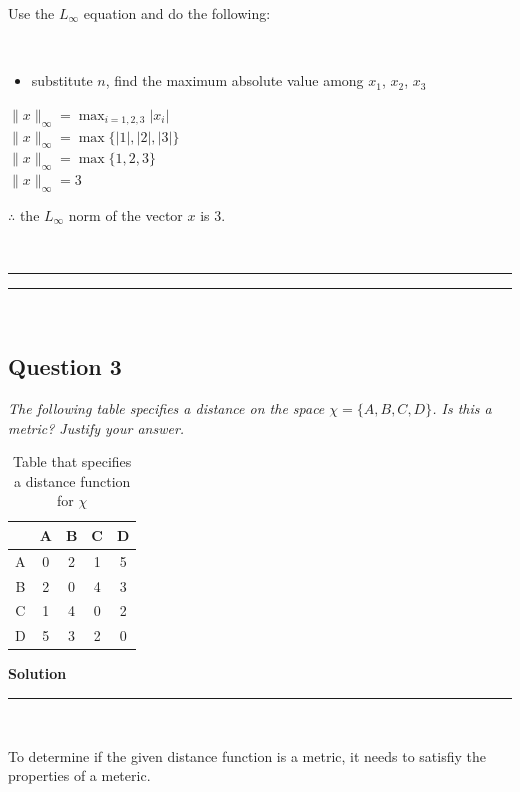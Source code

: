 \documentclass{article}
\begin{document}
\parbox{\textwidth}{Use the $L_{\infty}$ equation and do the following:}\\

\begin{itemize}
    \item {substitute $n$, find the maximum absolute value among $x_1$, $x_2$, $x_3$}
\end{itemize}

$\|x\|_{\infty} = \max_{i=1,2,3} |x_i|$\\

$\|x\|_{\infty} = \max\{|1|, |2|, |3|\}$\\

$\|x\|_{\infty} = \max\{1, 2, 3\}$\\

$\|x\|_{\infty} = 3$\\

\parbox{\textwidth}{$\therefore$ the $L_{\infty}$ norm of the vector $x$ is $3$.}\\

\noindent\rule{\textwidth}{0.4pt}
\noindent\rule{\textwidth}{0.4pt}\\

\newpage

\subsection*{Question 3}
\textit{The following table specifies a distance on the space $\chi = \{A, B, C, D\}$. Is this a metric? Justify your answer.}\\

\begin{table}[h]
\centering
\begin{tabular}{c|cccc}
  & A & B & C & D \\ \hline
A & 0 & 2 & 1 & 5 \\
B & 2 & 0 & 4 & 3 \\
C & 1 & 4 & 0 & 2 \\
D & 5 & 3 & 2 & 0 \\
\end{tabular}
\caption{Table that specifies a distance function for $\chi$}
\label{tab:example}
\end{table}

\textbf{Solution}

\noindent\rule{\textwidth}{0.4pt}\\

\parbox{\textwidth}{To determine if the given distance function is a metric, it needs to satisfiy the properties of a meteric.}\\
\end{document}
